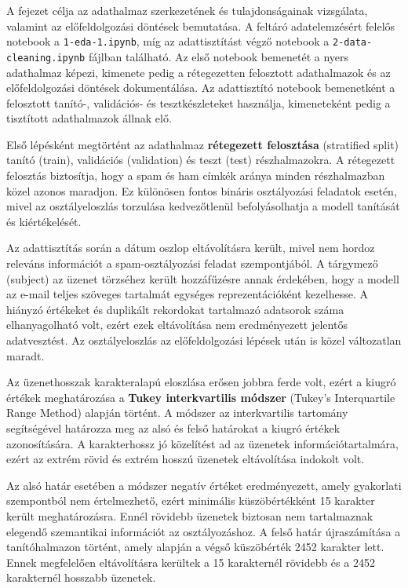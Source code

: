 A fejezet célja az adathalmaz szerkezetének és tulajdonságainak vizsgálata, valamint az előfeldolgozási döntések bemutatása. 
A feltáró adatelemzésért felelős notebook a \texttt{1-eda-1.ipynb}, míg az adattisztítást végző notebook a \texttt{2-data-cleaning.ipynb} fájlban található. 
Az első notebook bemenetét a nyers adathalmaz képezi, kimenete pedig a rétegezetten felosztott adathalmazok és az előfeldolgozási döntések dokumentálása. 
Az adattisztító notebook bemenetként a felosztott tanító-, validációs- és tesztkészleteket használja, kimeneteként pedig a tisztított adathalmazok állnak elő.

Első lépésként megtörtént az adathalmaz \textbf{rétegezett felosztása} (stratified split) tanító (train), validációs (validation) és teszt (test) részhalmazokra. 
A rétegezett felosztás biztosítja, hogy a spam és ham címkék aránya minden részhalmazban közel azonos maradjon. Ez különösen fontos bináris osztályozási feladatok esetén, mivel az osztályeloszlás torzulása kedvezőtlenül befolyásolhatja a modell tanítását és kiértékelését.

Az adattisztítás során a dátum oszlop eltávolításra került, mivel nem hordoz releváns információt a spam-osztályozási feladat szempontjából. 
A tárgymező (subject) az üzenet törzséhez került hozzáfűzésre annak érdekében, hogy a modell az e-mail teljes szöveges tartalmát egységes reprezentációként kezelhesse. 
A hiányzó értékeket és duplikált rekordokat tartalmazó adatsorok száma elhanyagolható volt, ezért ezek eltávolítása nem eredményezett jelentős adatvesztést. Az osztályeloszlás az előfeldolgozási lépések után is közel változatlan maradt.

Az üzenethosszak karakteralapú eloszlása erősen jobbra ferde volt, ezért a kiugró értékek meghatározása a \textbf{Tukey interkvartilis módszer} (Tukey’s Interquartile Range Method) alapján történt. 
A módszer az interkvartilis tartomány segítségével határozza meg az alsó és felső határokat a kiugró értékek azonosítására. 
A karakterhossz jó közelítést ad az üzenetek információtartalmára, ezért az extrém rövid és extrém hosszú üzenetek eltávolítása indokolt volt.

Az alsó határ esetében a módszer negatív értéket eredményezett, amely gyakorlati szempontból nem értelmezhető, ezért minimális küszöbértékként 15 karakter került meghatározásra. 
Ennél rövidebb üzenetek biztosan nem tartalmaznak elegendő szemantikai információt az osztályozáshoz.
A felső határ újraszámítása a tanítóhalmazon történt, amely alapján a végső küszöbérték 2452 karakter lett. 
Ennek megfelelően eltávolításra kerültek a 15 karakternél rövidebb és a 2452 karakternél hosszabb üzenetek.

